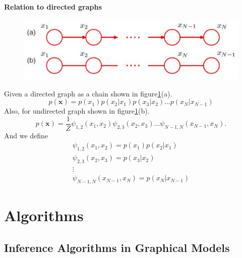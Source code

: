 \documentclass[a4paper]{book}
\renewcommand{\bf}{\mathbf}
\begin{document}
\subsubsection{Relation to directed graphs}
\begin{figure}
  \centering
  \includegraphics[width=\textwidth]{./imgs/GM3.eps}
  \caption{}\label{GM3}
\end{figure}
Given a directed graph as a chain shown in figure\ref{GM3}(a).
\begin{equation}\label{eq8.14}
  p(\bf x) =p(x_1)p(x_2|x_1)p(x_3|x_2)...p(x_N|x_{N-1})
\end{equation}
Also, for undirected graph shown in figure\ref{GM3}(b).
\begin{equation}\label{eq8.15}
  p(\bf x) = \frac{1}{Z}\psi_{1,2}(x_1,x_2)\psi_{2,3}(x_2,x_3)...\psi_{N-1,N}(x_{N-1},x_N).
\end{equation}
And we define
\begin{align}\label{eq8.15}
  \psi_{1,2}(x_1,x_2) = p(x_1)p(x_2|x_1) \\
  \psi_{2,3}(x_2,x_3)=p(x_3|x_2) \\
  \vdots \\
  \psi_{N-1,N}(x_{N-1},x_N) = p(x_N|x_{N-1})
\end{align}

\chapter{Algorithms}
\section{Inference Algorithms in Graphical Models}
\end{document}
